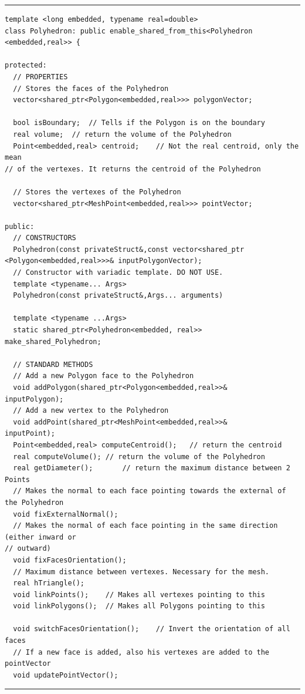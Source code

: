 \noindent\rule{16cm}{1pt}
\begin{lstlisting}[caption=File \texttt{Polyhedron.h}]
template <long embedded, typename real=double>
class Polyhedron: public enable_shared_from_this<Polyhedron
<embedded,real>> {

protected:
  // PROPERTIES
  // Stores the faces of the Polyhedron
  vector<shared_ptr<Polygon<embedded,real>>> polygonVector; 
	
  bool isBoundary;	// Tells if the Polygon is on the boundary
  real volume;	// return the volume of the Polyhedron
  Point<embedded,real> centroid;	// Not the real centroid, only the mean
// of the vertexes. It returns the centroid of the Polyhedron

  // Stores the vertexes of the Polyhedron
  vector<shared_ptr<MeshPoint<embedded,real>>> pointVector;	

public:
  // CONSTRUCTORS
  Polyhedron(const privateStruct&,const vector<shared_ptr
<Polygon<embedded,real>>>& inputPolygonVector);
  // Constructor with variadic template. DO NOT USE.
  template <typename... Args>
  Polyhedron(const privateStruct&,Args... arguments)

  template <typename ...Args>
  static shared_ptr<Polyhedron<embedded, real>>
make_shared_Polyhedron;

  // STANDARD METHODS
  // Add a new Polygon face to the Polyhedron 
  void addPolygon(shared_ptr<Polygon<embedded,real>>& 
inputPolygon);
  // Add a new vertex to the Polyhedron
  void addPoint(shared_ptr<MeshPoint<embedded,real>>& 
inputPoint);
  Point<embedded,real> computeCentroid();	// return the centroid
  real computeVolume();	// return the volume of the Polyhedron
  real getDiameter();		// return the maximum distance between 2 Points
  // Makes the normal to each face pointing towards the external of the Polyhedron
  void fixExternalNormal();	
  // Makes the normal of each face pointing in the same direction (either inward or 
// outward)
  void fixFacesOrientation();	
  // Maximum distance between vertexes. Necessary for the mesh.
  real hTriangle();	
  void linkPoints();	// Makes all vertexes pointing to this
  void linkPolygons();  // Makes all Polygons pointing to this

  void switchFacesOrientation();	// Invert the orientation of all faces
  // If a new face is added, also his vertexes are added to the pointVector
  void updatePointVector();
\end{lstlisting}
\noindent\rule{16cm}{1pt}\\

